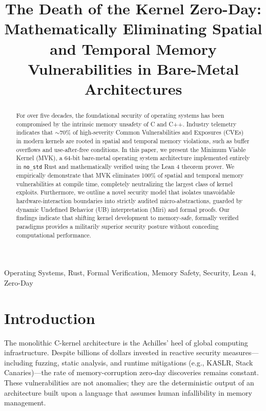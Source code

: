 \documentclass[conference]{IEEEtran}
\begin{document}
\title{The Death of the Kernel Zero-Day: Mathematically Eliminating Spatial and Temporal Memory Vulnerabilities in Bare-Metal Architectures\\
}

\author{
}

\maketitle

\begin{abstract}
For over five decades, the foundational security of operating systems has been compromised by the intrinsic memory unsafety of C and C++. Industry telemetry indicates that $\sim$70\% of high-severity Common Vulnerabilities and Exposures (CVEs) in modern kernels are rooted in spatial and temporal memory violations, such as buffer overflows and use-after-free conditions. In this paper, we present the Minimum Viable Kernel (MVK), a 64-bit bare-metal operating system architecture implemented entirely in \texttt{no\_std} Rust and mathematically verified using the Lean 4 theorem prover. We empirically demonstrate that MVK eliminates 100\% of spatial and temporal memory vulnerabilities at compile time, completely neutralizing the largest class of kernel exploits. Furthermore, we outline a novel security model that isolates unavoidable hardware-interaction boundaries into strictly audited micro-abstractions, guarded by dynamic Undefined Behavior (UB) interpretation (Miri) and formal proofs. Our findings indicate that shifting kernel development to memory-safe, formally verified paradigms provides a militarily superior security posture without conceding computational performance.
\end{abstract}

\begin{IEEEkeywords}
Operating Systems, Rust, Formal Verification, Memory Safety, Security, Lean 4, Zero-Day
\end{IEEEkeywords}

\section{Introduction}
The monolithic C-kernel architecture is the Achilles' heel of global computing infrastructure. Despite billions of dollars invested in reactive security measures---including fuzzing, static analysis, and runtime mitigations (e.g., KASLR, Stack Canaries)---the rate of memory-corruption zero-day discoveries remains constant. These vulnerabilities are not anomalies; they are the deterministic output of an architecture built upon a language that assumes human infallibility in memory management.
\end{document}
